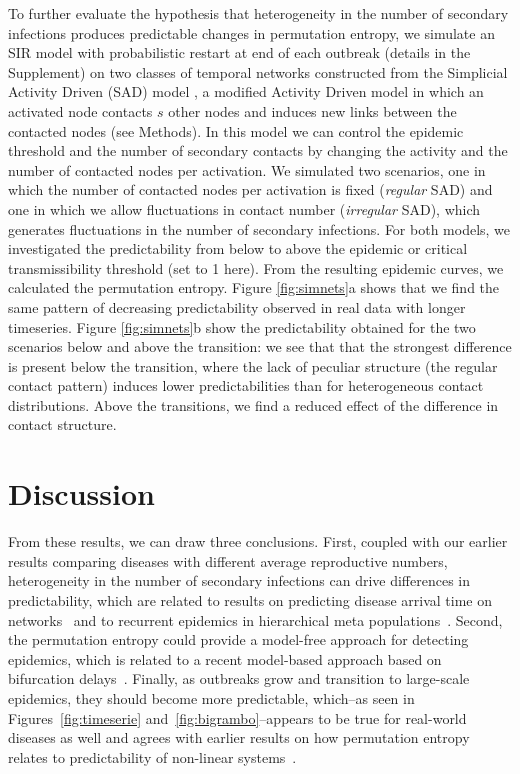 \documentclass[fleqn,12pt]{wlscirep}
\begin{document}
To further evaluate the hypothesis that heterogeneity in the number of secondary infections produces predictable changes in permutation entropy, we simulate an SIR model with probabilistic  restart at end of each outbreak (details in the Supplement) on two classes of temporal networks constructed from the Simplicial Activity Driven (SAD) model \cite{petri2018simplicial}, a modified Activity Driven model in which an activated node contacts $s$ other nodes and induces new links between the contacted nodes (see Methods). In this model we can control the epidemic threshold and the number of secondary contacts by changing the activity and the number of contacted nodes per activation. We simulated two scenarios, one in which the number of contacted nodes per activation is fixed (\emph{regular} SAD) and one in which we allow fluctuations in contact number (\emph{irregular} SAD), which generates fluctuations in the number of secondary infections. For both models, we investigated the predictability from below to above the epidemic or critical transmissibility threshold (set to 1 here). From the resulting epidemic curves, we calculated the permutation entropy. Figure \ref{fig:simnets}a shows that we find the same pattern of decreasing predictability observed in real data with longer timeseries. Figure \ref{fig:simnets}b show the predictability obtained for the two scenarios below and above the transition: we see that that the strongest difference is present below the transition, where the lack of peculiar structure (the regular contact pattern) induces lower predictabilities than for heterogeneous contact distributions. Above the transitions, we find a reduced effect of the difference in contact structure. 

\section*{Discussion}
From these results, we can draw three conclusions. 
First, coupled with our earlier results comparing diseases with different average reproductive numbers, heterogeneity in the number of secondary infections can drive differences in predictability, which are related to results on predicting disease arrival time on networks~\cite{shu2012effects} and to recurrent epidemics in hierarchical meta populations~\cite{watts2005multiscale}.  
Second, the permutation entropy could provide a model-free approach for detecting epidemics, which is related to a recent model-based approach based on bifurcation delays~\cite{dibble2016waiting, brett2018anticipating, miller2017forecasting}.  Finally, as outbreaks grow and transition to large-scale epidemics, they should become more predictable, which--as seen in Figures~\ref{fig:timeserie} and~\ref{fig:bigrambo}--appears to be true for real-world diseases as well and agrees with earlier results on how permutation entropy relates to predictability of non-linear systems~\cite{garland2014model}.
\end{document}
